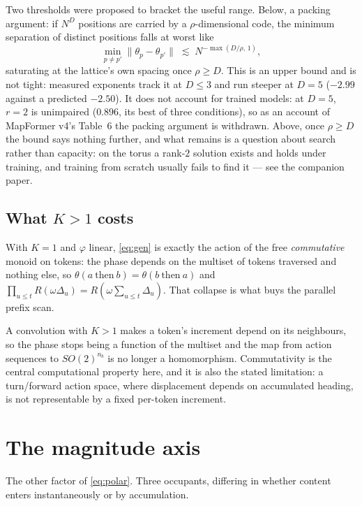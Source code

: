 \documentclass[11pt]{article}
\newcommand{\nb}{n_b}
\begin{document}
Two thresholds were proposed to bracket the useful range. Below, a packing argument: if $N^D$
positions are carried by a $\rho$-dimensional code, the minimum separation of
distinct positions falls at worst like
\begin{equation}
  \label{eq:packing}
  \min_{p\neq p'} \lVert \theta_p - \theta_{p'}\rVert \;\lesssim\; N^{-\max(D/\rho,\,1)},
\end{equation}
saturating at the lattice's own spacing once $\rho \ge D$. This is an upper bound
and is not tight: measured exponents track it at $D\le3$ and run steeper at $D=5$
($-2.99$ against a predicted $-2.50$). It does not account for trained models: at
$D=5$, $r=2$ is unimpaired ($0.896$, its best of three conditions), so as an account of
MapFormer v4's Table~6 the packing argument is withdrawn. Above, once $\rho \ge D$ the
bound says nothing further, and what remains is a question about search rather than
capacity: on the torus a rank-$2$ solution exists and holds under training, and
training from scratch usually fails to find it --- see the companion paper.

\subsection{What $K>1$ costs}
\label{sec:group}

With $K=1$ and $\varphi$ linear, \eqref{eq:gen} is exactly the action of the free
\emph{commutative} monoid on tokens: the phase depends on the multiset of tokens
traversed and nothing else, so
$\theta(a\ \text{then}\ b) = \theta(b\ \text{then}\ a)$ and
$\prod_{u\le t}R(\omega\Delta_u) = R(\omega\sum_{u\le t}\Delta_u)$. That collapse is
what buys the parallel prefix scan.

A convolution with $K>1$ makes a token's increment depend on its neighbours, so the
phase stops being a function of the multiset and the map from action sequences to
$SO(2)^{\nb}$ is no longer a homomorphism. Commutativity is the central
computational property here, and it is also the stated limitation: a turn/forward
action space, where displacement depends on accumulated heading, is not
representable by a fixed per-token increment.


\section{The magnitude axis}
\label{sec:pope}

The other factor of \eqref{eq:polar}. Three occupants, differing in whether content
enters instantaneously or by accumulation.
\end{document}
